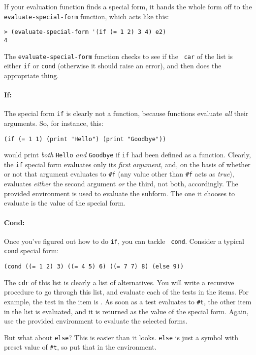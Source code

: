 \documentclass{article}
\begin{document}
If your evaluation function finds a special form, it hands the whole
form off to the {\tt evaluate-special-form} function, which acts like
this:
\begin{Verbatim}[frame=single]
> (evaluate-special-form '(if (= 1 2) 3 4) e2)
4  
\end{Verbatim}
The {\tt evaluate-special-form} function checks to see if the {\tt
  car} of the list is either {\tt if} or {\tt cond} (otherwise it
should raise an error), and then does the appropriate thing.

\paragraph{If:}
The special form {\tt if} is clearly not a function, because functions
evaluate {\em all} their arguments.  So, for instance, this:
\begin{Verbatim}[frame=single]
  (if (= 1 1) (print "Hello") (print "Goodbye"))
\end{Verbatim}
would print {\em both} {\tt Hello} {\em and} {\tt Goodbye} if {\tt if}
had been defined as a function.  Clearly, the {\tt if} special form
evaluates only its {\em first argument}, and, on the basis of whether
or not that argument evaluates to \verb|#f| (any value other than
\verb|#f| acts as {\em true}), evaluates {\em either} the second
argument {\em or} the third, not both, accordingly.
The provided environment is used to evaluate the subform.
The one it chooses to evaluate
is the value of the special form.

\paragraph{Cond:}
Once you've figured out how to do {\tt if}, you can tackle {\tt
  cond}.  Consider a typical {\tt cond} special form:
\begin{Verbatim}[frame=single]
  (cond ((= 1 2) 3) ((= 4 5) 6) ((= 7 7) 8) (else 9))
\end{Verbatim}
The {\tt cdr} of this list is clearly a list of alternatives.  You
will write a recursive procedure to go through this list, and evaluate
each of the tests in the items.  For example, the test in the item
 is .  As soon as a test
evaluates to \verb|#t|, the other item in the list is evaluated, and
it is returned as the value of the special form.  Again, use the
provided environment to evaluate the selected forms.

But what about {\tt else}?  This is easier than it looks.  {\tt else}
is just a symbol with preset value of \verb|#t|, so put that in the
environment. 
  
\end{document}
